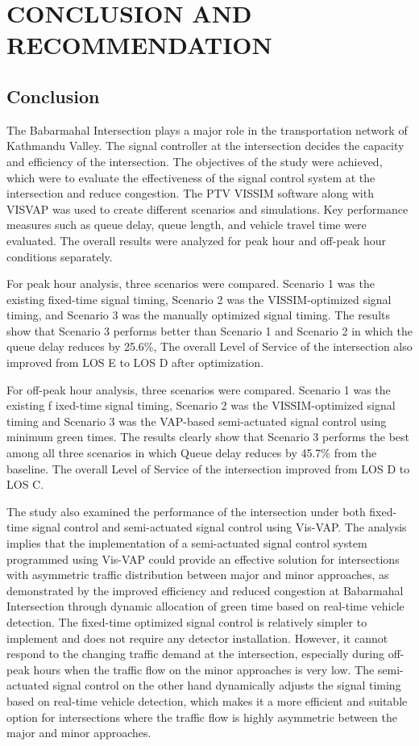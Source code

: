 \chapter{CONCLUSION AND RECOMMENDATION}

\section{Conclusion}
The Babarmahal Intersection plays a major role in the transportation network of Kathmandu Valley. The signal controller at the intersection decides the capacity and efficiency of the intersection. The objectives of the study were achieved, which were to evaluate the effectiveness of the signal control system at the intersection and reduce congestion. The PTV VISSIM software along with VISVAP was used to create different scenarios and simulations. Key performance measures such as queue delay, queue length, and vehicle travel time were evaluated. The overall results were analyzed for peak hour and off-peak hour conditions separately.

For peak hour analysis, three scenarios were compared. Scenario 1 
was the existing fixed-time signal timing, Scenario 2 was the 
VISSIM-optimized signal timing, and Scenario 3 was the manually 
optimized signal timing. The results show that Scenario 3 performs 
better than Scenario 1 and Scenario 2 in which the queue delay 
reduces by 25.6\%, The overall Level of Service of the intersection 
also improved from LOS E to LOS D after optimization. 

For off-peak hour analysis, three scenarios were compared. Scenario 
1 was the existing f ixed-time signal timing, Scenario 2 was the 
VISSIM-optimized signal timing and Scenario 3 was the VAP-based 
semi-actuated signal control using minimum green times. The results 
clearly show that Scenario 3 performs the best among all three 
scenarios in which Queue delay reduces by 45.7\% from the baseline. 
The overall Level of Service of the intersection improved from LOS 
D to LOS C. 

The study also examined the performance of the intersection under 
both fixed-time signal control and semi-actuated signal control 
using Vis-VAP. The analysis implies that the implementation of a 
semi-actuated signal control system programmed using Vis-VAP could 
provide an effective solution for intersections with asymmetric 
traffic distribution between major and minor approaches, as 
demonstrated by the improved efficiency and reduced congestion at 
Babarmahal Intersection through dynamic allocation of green time 
based on real-time vehicle detection. The fixed-time optimized 
signal control is relatively simpler to implement and does not 
require any detector installation. However, it cannot respond to 
the changing traffic demand at the intersection, especially during 
off-peak hours when the traffic flow on the minor approaches is very 
low. The semi-actuated signal control on the other hand dynamically 
adjusts the signal timing based on real-time vehicle detection, 
which makes it a more efficient and suitable option for intersections 
where the traffic flow is highly asymmetric between the major and 
minor approaches.

